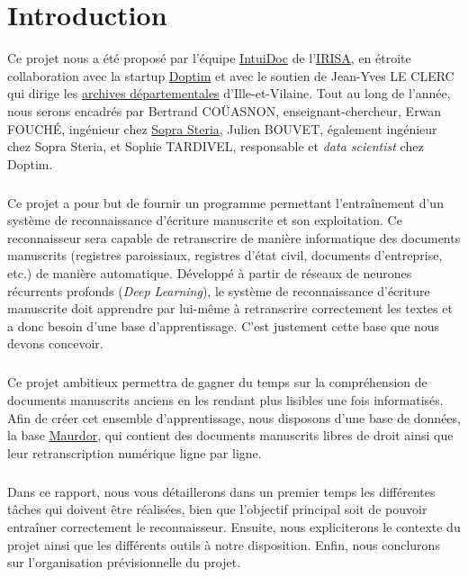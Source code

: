 \chapter{Introduction}
\setcounter{page}{1}

Ce projet nous a été proposé par l’équipe \href{https://www-intuidoc.irisa.fr/}{IntuiDoc}
de l’\href{https://www.irisa.fr/}{IRISA}, en étroite collaboration avec la startup
\href{http://www.doptim.eu}{Doptim} et avec le soutien de Jean-Yves LE CLERC qui dirige
les \href{http://archives.ille-et-vilaine.fr/fr}{archives départementales} d'Ille-et-Vilaine.
Tout au long de l’année, nous serons encadrés par Bertrand COÜASNON, enseignant-chercheur,
Erwan FOUCHÉ, ingénieur chez \href{https://www.soprasteria.com/fr}{Sopra Steria}, Julien BOUVET,
également ingénieur chez Sopra Steria, et Sophie TARDIVEL, responsable et \textit{data scientist}
chez Doptim.

\paragraph{}
Ce projet a pour but de fournir un programme permettant l’entraînement d’un système
de reconnaissance d’écriture manuscrite et son exploitation. Ce reconnaisseur sera
capable de retranscrire de manière informatique des documents manuscrits
(registres paroissiaux, registres d’état civil, documents d’entreprise, etc.)
de manière automatique. Développé à partir de réseaux de neurones récurrents profonds
(\textit{Deep Learning}), le système de reconnaissance d'écriture manuscrite doit apprendre
par lui-même à retranscrire correctement les textes et a donc besoin d’une base
d’apprentissage. C’est justement cette base que nous devons concevoir.

\paragraph{}
Ce projet ambitieux permettra de gagner du temps sur la compréhension de documents
manuscrits anciens en les rendant plus lisibles une fois informatisés.
Afin de créer cet ensemble d’apprentissage, nous disposons d’une base de données,
la base \href{http://www.maurdor-campaign.org/}{Maurdor}, qui contient des documents
manuscrits libres de droit ainsi que leur retranscription numérique ligne par ligne.

\paragraph{}
Dans ce rapport, nous vous détaillerons dans un premier temps les différentes
tâches qui doivent être réalisées, bien que l’objectif principal soit de pouvoir
entraîner correctement le reconnaisseur. Ensuite, nous expliciterons le contexte
du projet ainsi que les différents outils à notre disposition. Enfin, nous conclurons
sur l’organisation prévisionnelle du projet.